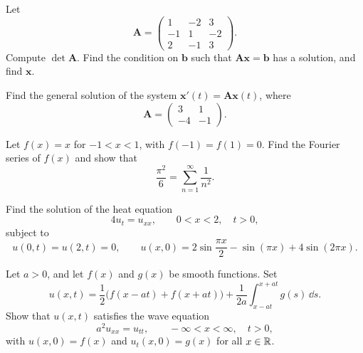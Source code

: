\documentclass[11pt,oneside]{article}
\begin{document}
\begin{problem}
Let
\[\mathbf A=\begin{pmatrix}1&-2&3\\-1&1&-2\\2&-1&3\end{pmatrix}.\]
Compute $\det\mathbf A$. Find the condition on $\mathbf b$ such that $\mathbf A\mathbf x=\mathbf b$ has a solution, and find $\mathbf x$.
\end{problem}

\begin{problem}
Find the general solution of the system $\mathbf x'(t)=\mathbf A\mathbf x(t)$, where
\[\mathbf A=\begin{pmatrix}3&1\\-4&-1\end{pmatrix}.\]
\end{problem}

\begin{problem}
Let $f(x)=x$ for $-1<x<1$, with $f(-1)=f(1)=0$. Find the Fourier series of $f(x)$ and show that
\[\frac{\pi^2}{6}=\sum_{n=1}^{\infty}\frac{1}{n^2}.\]
\end{problem}

\begin{problem}
Find the solution of the heat equation
\[4u_t=u_{xx},\qquad 0<x<2,\quad t>0,\]
subject to
\[u(0,t)=u(2,t)=0,\qquad u(x,0)=2\sin\frac{\pi x}{2}-\sin(\pi x)+4\sin(2\pi x).\]
\end{problem}

\begin{problem}
Let $a>0$, and let $f(x)$ and $g(x)$ be smooth functions. Set
\[u(x,t)=\frac12\bigl(f(x-at)+f(x+at)\bigr)+\frac{1}{2a}\int_{x-at}^{x+at}g(s)\,\dd s.\]
Show that $u(x,t)$ satisfies the wave equation
\[a^2u_{xx}=u_{tt},\qquad -\infty<x<\infty,\quad t>0,\]
with $u(x,0)=f(x)$ and $u_t(x,0)=g(x)$ for all $x\in\mathbb{R}$.
\end{problem}
\end{document}
